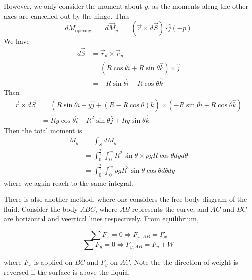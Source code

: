 \documentclass[12pt]{article}
\begin{document}
\begin{ex}
However, we only consider the moment about $y$, as the moments along the other axes are cancelled out by the hinge. Thus
$$dM_{\text{opening}} = ||d\vec{M}_y|| = (\vec{r}\times d\vec{S})\cdot\hat{j} (-p)$$
We have
\begin{align*}
	d\vec{S} &= \vec{r}_\theta \times \vec{r}_y \\
		 &= (R\cos\theta\hat{i} + R\sin\theta\hat{k}) \times \hat{j} \\
		 &= -R\sin\theta\hat{i} + R\cos\theta\hat{k}
\end{align*}
Then
\begin{align*}
	\vec{r} \times d\vec{S} &= (R\sin\theta\hat{i} + y\hat{j} + (R-R\cos\theta)\hat{k}) \times (-R\sin\theta\hat{i} + R\cos\theta\hat{k}) \\
				&= Ry\cos\theta\hat{i} - R^2\sin\theta\hat{j} + Ry\sin\theta\hat{k}
\end{align*}
Then the total moment is
\begin{align*}
	M_y &= \int_S dM_y \\
	    &= \int_0^{\frac{\pi}{2}} \int_0^w R^2\sin\theta \times \rho gR\cos\theta dyd\theta \\
	    &= \int_0^{\frac{\pi}{2}} \int_0^w \rho gR^3 \sin\theta\cos\theta d\theta dy
\end{align*}
where we again reach to the same integral.
\end{ex}

There is also another method, where one considers the free body diagram of the fluid. Consider the body $ABC$, where $AB$ represents the curve, and $AC$ and $BC$ are horizontal and veertical lines respectively. From equilibrium,

$$\sum F_x = 0 \Rightarrow F_{x,AB} = F_x$$
$$\sum F_y = 0 \Rightarrow F_{y,AB} = F_y + W$$

where $F_x$ is applied on $BC$ and $F_y$ on $AC$. Note the the direction of weight is reversed if the surface is above the liquid.
\end{document}
